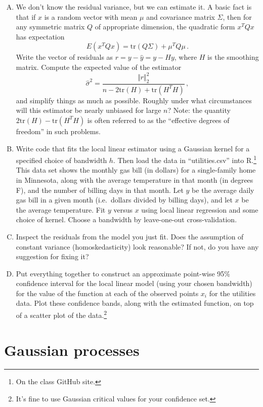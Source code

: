 \documentclass[11pt]{article}
\begin{document}
\begin{enumerate}[(A)]
\item We don't know the residual variance, but we can estimate it.  A basic fact is that if $x$ is a random vector with mean $\mu$ and covariance matrix $\Sigma$, then for any symmetric matrix $Q$ of appropriate dimension, the quadratic form $x^T Q x$ has expectation
$$
E(x^T Q x) = \mbox{tr}(Q \Sigma) + \mu^T Q \mu \, .
$$
Write the vector of residuals as $r = y - \hat{y} = y - Hy$, where $H$ is the smoothing matrix.  Compute the expected value of the estimator
$$
\hat{\sigma}^2 = \frac{\Vert r \Vert_2^2}{n - 2\mbox{tr}(H) + \mbox{tr}(H^T H)} \, ,
$$
and simplify things as much as possible.  Roughly under what circumstances will this estimator be nearly unbiased for large $n$?  Note: the quantity $2\mbox{tr}(H) - \mbox{tr}(H^T H)$ is often referred to as the ``effective degrees of freedom'' in such problems.

\item Write code that fits the local linear estimator using a Gaussian kernel for a specified choice of bandwidth $h$. Then load the data in ``utilities.csv'' into R.\footnote{On the class GitHub site.}  This data set shows the monthly gas bill (in dollars) for a single-family home in Minnesota, along with the average temperature in that month (in degrees F), and the number of billing days in that month.  Let $y$ be the average daily gas bill in a given month (i.e.~dollars divided by billing days), and let $x$ be the average temperature.  Fit $y$ versus $x$ using local linear regression and some choice of kernel.  Choose a bandwidth by leave-one-out cross-validation.

\item Inspect the residuals from the model you just fit.  Does the assumption of constant variance (homoskedasticity) look reasonable?  If not, do you have any suggestion for fixing it?

\item Put everything together to construct an approximate point-wise 95\% confidence interval for the local linear model (using your chosen bandwidth) for the value of the function at each of the observed points $x_i$ for the utilities data.  Plot these confidence bands, along with the estimated function, on top of a scatter plot of the data.\footnote{It's fine to use Gaussian critical values for your confidence set.}

\end{enumerate}


\section{Gaussian processes}
\end{document}
